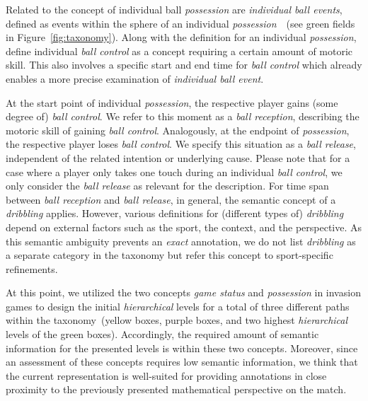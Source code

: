 Related to the concept of individual ball \textit{possession} are \textit{individual ball events}, defined as events within the sphere of an individual \textit{possession}~\cite{link2017individual}~(see green fields in Figure~\ref{fig:taxonomy}). 
Along with the definition for an individual \textit{possession}, \citet{link2017individual} define individual \textit{ball control} as a concept requiring a certain amount of motoric skill.
This also involves a specific start and end time for \textit{ball control} which already enables a more precise examination of \textit{individual ball event}.

At the start point of individual \textit{possession}, the respective player gains (some degree of) \textit{ball control}. We refer to this moment as a \textit{ball reception}, describing the motoric skill of gaining \textit{ball control}.
Analogously, at the endpoint of \textit{possession}, the respective player loses \textit{ball control}. We specify this situation as a \textit{ball release}, independent of the related intention or underlying cause. Please note that for a case where a player only takes one touch during an individual \textit{ball control}, we only consider the \textit{ball release} as relevant for the description.
For time span between \textit{ball reception} and \textit{ball release}, in general, the semantic concept of a \textit{dribbling} applies. However, various definitions for (different types of) \textit{dribbling} depend on external factors such as the sport, the context, and the perspective. As this semantic ambiguity prevents an \textit{exact} annotation, we do not list \textit{dribbling} as a separate category in the taxonomy but refer this concept to sport-specific refinements.     

At this point, we utilized the two concepts \textit{game status} and \textit{possession} in invasion games to design the initial \textit{hierarchical} levels for a total of three different paths within the taxonomy~(yellow boxes, purple boxes, and two highest \textit{hierarchical} levels of the green boxes). Accordingly, the required amount of semantic information for the presented levels is within these two concepts. Moreover, since an assessment of these concepts requires low semantic information, we think that the current representation is well-suited for providing annotations in close proximity to the previously presented mathematical perspective on the match. 

